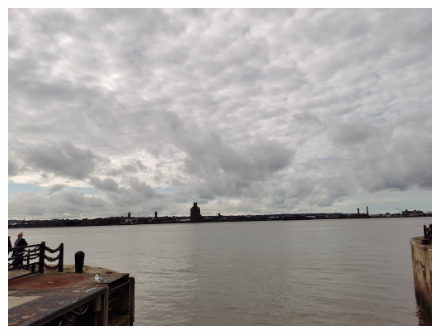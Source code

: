 \documentclass[11pt]{article}
\begin{document}
\begin{figure}[H]
    \centering
    \includegraphics[width=\textwidth]{1X.jpg}
\end{figure}
\end{document}
